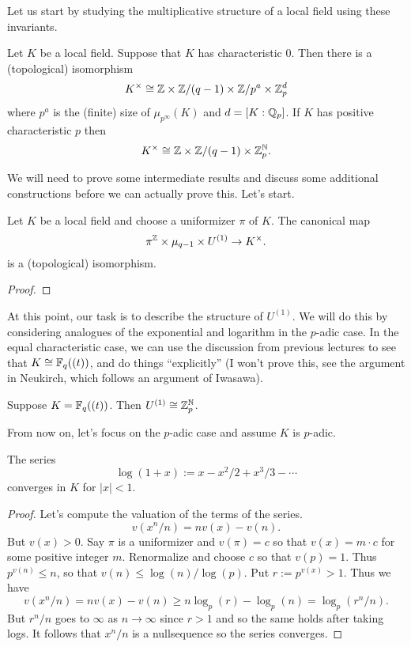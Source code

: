 Let us start by studying the multiplicative structure of a local field using these invariants.
\begin{theorem}
  Let $K$ be a local field.
  Suppose that $K$ has characteristic $0$.
  Then there is a (topological) isomorphism
  \[ K^{\times} \cong \mathbb{Z} \times \mathbb{Z}/(q-1) \times \mathbb{Z}/p^{a} \times \mathbb{Z}_{p}^{d} \]
  where $p^{a}$ is the (finite) size of $\mu_{p^{\infty}}(K)$ and $d = [K:\mathbb{Q}_{p}]$.
  If $K$ has positive characteristic $p$ then
  \[ K^{\times} \cong \mathbb{Z} \times \mathbb{Z}/(q-1) \times \mathbb{Z}_{p}^{\mathbb{N}}. \]
\end{theorem}

We will need to prove some intermediate results and discuss some additional constructions before we can actually prove this.
Let's start.

\begin{proposition}
  Let $K$ be a local field and choose a uniformizer $\pi$ of $K$.
  The canonical map
  \[ \pi^{\mathbb{Z}} \times \mu_{q-1} \times U^{(1)} \to K^{\times}. \]
  is a (topological) isomorphism.
\end{proposition}
\begin{proof}
\end{proof}

At this point, our task is to describe the structure of $U^{(1)}$.
We will do this by considering analogues of the exponential and logarithm in the $p$-adic case.
In the equal characteristic case, we can use the discussion from previous lectures to see that $K \cong \mathbb{F}_{q}((t))$, and do things ``explicitly'' (I won't prove this, see the argument in Neukirch, which follows an argument of Iwasawa).

\begin{proposition}
  Suppose $K = \mathbb{F}_{q}((t))$.
  Then $U^{(1)} \cong \mathbb{Z}_{p}^{\mathbb{N}}$.
\end{proposition}

From now on, let's focus on the $p$-adic case and assume $K$ is $p$-adic.
\begin{lemma}
  The series
  \[ \log(1+x) := x - x^{2}/2 + x^{3}/3 - \cdots \]
  converges in $K$ for $|x| < 1$.
\end{lemma}
\begin{proof}
  Let's compute the valuation of the terms of the series.
  \[ v(x^{n}/n) = n v(x) - v(n). \]
  But $v(x) > 0$.
  Say $\pi$ is a uniformizer and $v(\pi) = c$ so that $v(x) = m \cdot c$ for some positive integer $m$.
  Renormalize and choose $c$ so that $v(p) = 1$.
  Thus $p^{v(n)} \le n$, so that $v(n) \le \log(n)/\log(p)$.
  Put $r := p^{v(x)} > 1$.
  Thus we have
  \[ v(x^{n}/n) = n v(x) - v(n) \geq n \log_{p}(r) - \log_{p}(n) = \log_{p}(r^{n}/n). \]
  But $r^{n}/n$ goes to $\infty$ as $n \to \infty$ since $r > 1$ and so the same holds after taking logs.
  It follows that $x^{n}/n$ is a nullsequence so the series converges.
\end{proof}

